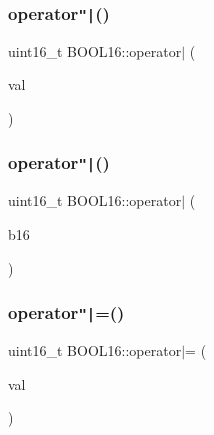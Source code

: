\hypertarget{struct_b_o_o_l16_a8af17c671699145edb075ea420c4538b}{}\label{struct_b_o_o_l16_a8af17c671699145edb075ea420c4538b} 
\subsubsection{\texorpdfstring{operator\texttt{"|}()}{operator|()}\hspace{0.1cm}{\footnotesize\ttfamily [1/2]}}
{\footnotesize\ttfamily uint16\+\_\+t B\+O\+O\+L16\+::operator$\vert$ (\begin{DoxyParamCaption}\item[{const uint16\+\_\+t}]{val }\end{DoxyParamCaption})\hspace{0.3cm}{\ttfamily [inline]}}

\hypertarget{struct_b_o_o_l16_acda76a27eb6ea4e92acfb166cdf3f89b}{}\label{struct_b_o_o_l16_acda76a27eb6ea4e92acfb166cdf3f89b} 
\subsubsection{\texorpdfstring{operator\texttt{"|}()}{operator|()}\hspace{0.1cm}{\footnotesize\ttfamily [2/2]}}
{\footnotesize\ttfamily uint16\+\_\+t B\+O\+O\+L16\+::operator$\vert$ (\begin{DoxyParamCaption}\item[{const \hyperlink{struct_b_o_o_l16}{B\+O\+O\+L16}}]{b16 }\end{DoxyParamCaption})\hspace{0.3cm}{\ttfamily [inline]}}

\hypertarget{struct_b_o_o_l16_a9178b1131b1e97f71d2554ac61fbd3c3}{}\label{struct_b_o_o_l16_a9178b1131b1e97f71d2554ac61fbd3c3} 
\subsubsection{\texorpdfstring{operator\texttt{"|}=()}{operator|=()}\hspace{0.1cm}{\footnotesize\ttfamily [1/2]}}
{\footnotesize\ttfamily uint16\+\_\+t B\+O\+O\+L16\+::operator$\vert$= (\begin{DoxyParamCaption}\item[{const uint16\+\_\+t}]{val }\end{DoxyParamCaption})\hspace{0.3cm}{\ttfamily [inline]}}

